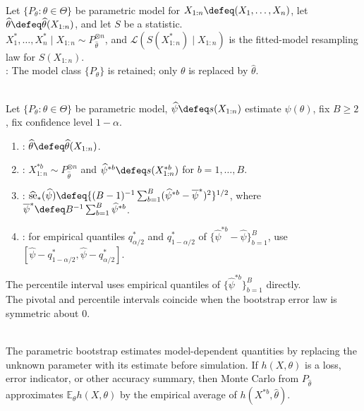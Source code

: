 \begin{definition} \label{def:parametric-bootstrap} \\
Let $\{P_\theta:\theta\in\Theta\}$ be parametric model for $X_{1:n}\defeq(X_1,\ldots,X_n)$, let $\widehat{\theta}\defeq\widehat{\theta}(X_{1:n})$, and let $S$ be a statistic.\\
$X_1^\ast,\ldots,X_n^\ast\mid X_{1:n}\sim P_{\widehat{\theta}}^{\otimes n}$, and $\mathcal{L}(S(X_{1:n}^\ast)\mid X_{1:n})$ is the fitted-model resampling law for $S(X_{1:n})$.\\
: The model class $\{P_\theta\}$ is retained; only $\theta$ is replaced by $\widehat{\theta}$.
\end{definition}

\begin{method} \label{meth:parametric-bootstrap-standard-errors-and-intervals} \\
Let $\{P_\theta:\theta\in\Theta\}$ be parametric model, $\widehat{\psi}\defeq s(X_{1:n})$ estimate $\psi(\theta)$, fix $B\geq2$, fix confidence level $1-\alpha$.
\begin{enumerate}[label=(\roman*)]
\setlength{\itemsep}{0pt}
\item {}: $\widehat{\theta}\defeq\widehat{\theta}(X_{1:n})$.
\item {}: $X_{1:n}^{\ast b}\sim P_{\widehat{\theta}}^{\otimes n}$ and $\widehat{\psi}^{\ast b}\defeq s(X_{1:n}^{\ast b})$ for $b=1,\ldots,B$.
\item {}: $\widehat{\operatorname{se}}_\ast(\widehat{\psi})\defeq\{(B-1)^{-1}\sum_{b=1}^{B}(\widehat{\psi}^{\ast b}-\overline{\psi}^{\ast})^2\}^{1/2}$, where $\overline{\psi}^{\ast}\defeq B^{-1}\sum_{b=1}^{B}\widehat{\psi}^{\ast b}$.
\item {}: for empirical quantiles $q_{\alpha/2}^\ast$ and $q_{1-\alpha/2}^\ast$ of $\{\widehat{\psi}^{\ast b}-\widehat{\psi}\}_{b=1}^{B}$, use $[\widehat{\psi}-q_{1-\alpha/2}^\ast,\widehat{\psi}-q_{\alpha/2}^\ast]$.
\end{enumerate}
The percentile interval uses empirical quantiles of $\{\widehat{\psi}^{\ast b}\}_{b=1}^{B}$ directly.\\
The pivotal and percentile intervals coincide when the bootstrap error law is symmetric about $0$.
\end{method}

\begin{remark} \label{rem:parametric-bootstrap-plug-in-principle} \\
The parametric bootstrap estimates model-dependent quantities by replacing the unknown parameter with its estimate before simulation. If $h(X,\theta)$ is a loss, error indicator, or other accuracy summary, then Monte Carlo from $P_{\widehat{\theta}}$ approximates $\mathbb{E}_\theta h(X,\theta)$ by the empirical average of $h(X^{\ast b},\widehat{\theta})$.
\end{remark}


